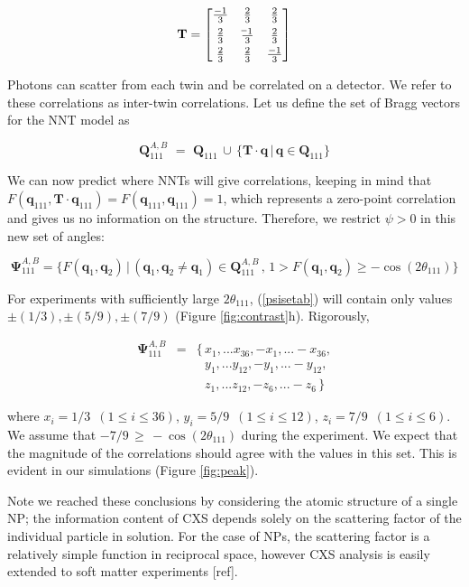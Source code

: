 \documentclass [11pt,fleqn]{article}
\newcommand*{\matminus}{%
  \leavevmode
  \hphantom{0}%
  \llap{%
    \settowidth{\dimen0 }{$0$}%
    \resizebox{1.1\dimen0 }{\height}{$-$}%
  }%
}
\def \be {\begin{equation}}
\def \ee {\end{equation}}
\def \beq {\begin{eqnarray}}
\def \eeq {\end{eqnarray}}
\begin{document}
\be \label{twinmat}
\mathbf T = \begin{bmatrix}
       \frac{-1}{3} & \frac{2}{3} & \frac{2}{3}           \\[0.3em]
       \frac{2}{3} & \frac{\matminus 1}{3}           & \frac{2}{3} \\[0.3em]
       \frac{2}{3}           & \frac{2}{3} & \frac{-1}{3}
     \end{bmatrix}
\ee

Photons can scatter from each twin and be correlated on a detector. We refer to these correlations as inter-twin correlations. Let us define the set of Bragg vectors for the NNT model as 

\be
\bm Q^{A,B}_{111}\,\, =\,\, \bm Q_{111} \, \cup \, \{  \mathbf T  \cdot \bm q \, \big |\, \bm q \in \bm Q_{111} \}
\ee

We can now predict where NNTs will give correlations, keeping in mind that $F( \bm q_{111}, \mathbf T \cdot \bm q_{111}) = F( \bm q_{111}, \bm q_{111}) = 1$, which represents a zero-point correlation and gives us no information on the structure. Therefore, we restrict $\psi > 0$ in this new set of angles: 

\be \label{psisetab}
\bm \Psi^{A,B}_{111} = \{ F( \bm q_1, \bm q_2)\, \big | \, (\bm q_1, \bm q_2 \ne \bm q_1) \in \bm Q^{A,B}_{111}\, ,\, 1 > F( \bm q_1, \bm q_2) \ge -\cos ( 2\theta_{111}  )  \}
\ee

For experiments with sufficiently large $2\theta_{111}$, (\ref{psisetab}) will contain only values $\pm (1/3), \pm (5/9), \pm(7/9)$ (Figure \ref{fig:contrast}h).  Rigorously, 

\beq
\bm \Psi^{A,B}_{111} &=& \{\, x_1, ... x_{36}, -x_1, ... -x_{36},  \\
&&\,\,\,\, y_1, ... y_{12}, -y_1, ... -y_{12}, \\
&& \,\,\,\, z_1, ... z_{12}, -z_6, ... -z_6 \, \}
\eeq

where $x_i = 1/3\,\,\, (1 \le i \le 36 )$, $y_i = 5/9\,\,\, (1 \le i \le 12 )$, $z_i = 7/9\,\,\, (1 \le i \le 6 )$.  We assume that $ -7/9 \, \ge \, - \cos (2\theta_{111}) $ during the experiment. We expect that the magnitude of the correlations should agree with the values in this set. This is evident in our simulations (Figure \ref{fig:peak}).

Note we reached these conclusions by considering the atomic structure of a single NP; the information content of CXS depends solely on the scattering factor of the individual particle in solution. For the case of NPs, the scattering factor is a relatively simple function in reciprocal space, however CXS analysis is easily extended to soft matter experiments [ref].
\end{document}
